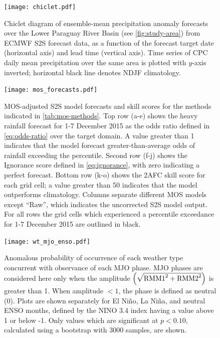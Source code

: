 \documentclass{ametsoc}
\begin{document}
\begin{figure}
	\noindent\texttt{[image: chiclet.pdf]}
	\caption{
		Chiclet diagram \citep{Carbin:2016fx} of ensemble-mean precipitation anomaly forecasts over the Lower Paraguay River Basin (see \cref{fig:study-area}) from ECMWF S2S forecast data, as a function of the forecast target date (horizontal axis) and lead time (vertical axis).
		Time series of CPC daily mean precipitation over the same area is plotted with $y$-axis inverted; horizontal black line denotes NDJF climatology.
	}\label{fig:chiclet}
\end{figure}

\begin{figure}
	\noindent\texttt{[image: mos\_forecasts.pdf]}
	\caption{
		MOS-adjusted S2S model forecasts and skill scores for the methods indicated in \cref{tab:mos-methods}.
		Top row (a-e) shows the heavy rainfall forecast for 1-7 December 2015 as the odds ratio defined in \cref{eq:odds-ratio} over the target domain.
		A value greater than 1 indicates that the model forecast greater-than-average odds of rainfall exceeding the  percentile.
        Second row (f-j) shows the Ignorance score defined in \cref{eq:ignorance}, with zero indicating a perfect forecast.
		Bottom row (k-o) shows the 2AFC skill score for each grid cell; a value greater than 50 indicates that the model outperforms climatology.
		Columns separate different MOS models except ``Raw'', which indicates the uncorrected S2S model output.
		For all rows the grid cells which experienced a  percentile exceedance for 1-7 December 2015 are outlined in black.
	}\label{fig:subs-prob-fcst}
\end{figure}

\begin{figure}
	\noindent\texttt{[image: wt\_mjo\_enso.pdf]}
	\caption{
		Anomalous probability of occurrence of each weather type concurrent with observance of each MJO phase.
		MJO phases are considered here only when the amplitude $\qty(\sqrt{\text{RMM1}^2 + \text{RMM2}^2})$ is greater than 1.
		When amplitude $< 1$, the phase is defined as neutral (0).
		Plots are shown separately for El Ni\~no, La Ni\~na, and neutral ENSO months, defined by the NINO 3.4 index having a value above 1 or below -1.
		Only values which are significant at $p<0.10$, calculated using a bootstrap with 3000 samples, are shown.
	}\label{fig:wt-mjo-enso}
\end{figure}
\end{document}
